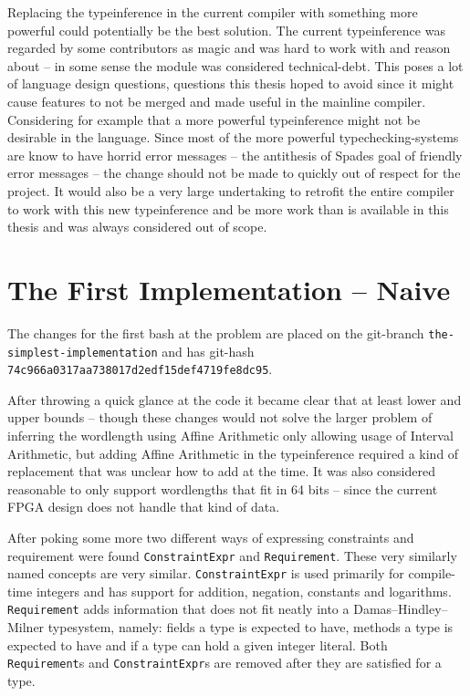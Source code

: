 \documentclass[msc,lith,english]{liuthesis}
\begin{document}
Replacing the typeinference in the current compiler with something more powerful could potentially be the best solution. The current typeinference was regarded by some contributors as magic and was hard to work with and reason about -- in some sense the module was considered technical-debt. This poses a lot of language design questions, questions this thesis hoped to avoid since it might cause features to not be merged and made useful in the mainline compiler. Considering for example that a more powerful typeinference might not be desirable in the language. Since most of the more powerful typechecking-systems are know to have horrid error messages -- the antithesis of Spades goal of friendly error messages -- the change should not be made to quickly out of respect for the project. It would also be a very large undertaking to retrofit the entire compiler to work with this new typeinference and be more work than is available in this thesis and was always considered out of scope. 

\section{The First Implementation -- Naive}
\label{sec:First}
The changes for the first bash at the problem are placed on the git-branch \verb+the-simplest-implementation+ and has git-hash \verb+74c966a0317aa738017d2edf15def4719fe8dc95+.

After throwing a quick glance at the code it became clear that at least lower and upper bounds -- though these changes would not solve the larger problem of inferring the wordlength using Affine Arithmetic only allowing usage of Interval Arithmetic, but adding Affine Arithmetic in the typeinference required a kind of replacement that was unclear how to add at the time. It was also considered reasonable to only support wordlengths that fit in 64 bits -- since the current FPGA design does not handle that kind of data.

After poking some more two different ways of expressing constraints and requirement were found \verb+ConstraintExpr+ and \verb+Requirement+. These very similarly named concepts are very similar. \verb+ConstraintExpr+ is used primarily for compile-time integers and has support for addition, negation, constants and logarithms. \verb+Requirement+ adds information that does not fit neatly into a Damas–Hindley–Milner typesystem, namely: fields a type is expected to have, methods a type is expected to have and if a type can hold a given integer literal. Both \verb+Requirement+s and \verb+ConstraintExpr+s are removed after they are satisfied for a type.
\end{document}

